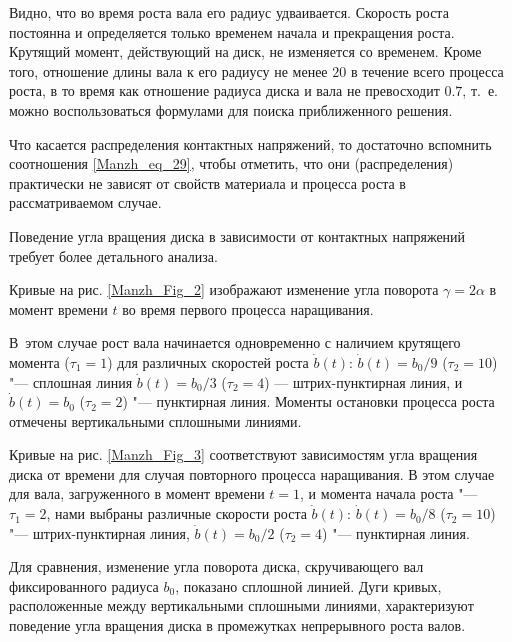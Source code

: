 Видно, что во время роста вала его радиус удваивается. Скорость роста постоянна и определяется только временем начала и прекращения роста. Крутящий момент, действующий на диск, не изменяется со временем. Кроме того, отношение длины вала к его радиусу не менее $20 $ в течение всего процесса роста, в то время как отношение радиуса диска и вала не превосходит $0.7 $, т.~е. можно воспользоваться формулами для поиска приближенного решения.





Что касается распределения контактных напряжений, то достаточно вспомнить соотношения \eqref{Manzh_eq_29}, чтобы отметить, что они (распределения) практически не зависят от свойств материала и процесса роста в рассматриваемом случае.



Поведение угла вращения диска в зависимости от контактных напряжений требует более детального анализа.



Кривые на рис. \ref{Manzh_Fig_2} изображают изменение угла поворота $\gamma=2\alpha$ в момент времени $t$ во время первого процесса наращивания. 

В~этом случае рост вала начинается одновременно с наличием крутящего момента ($\tau_1=1$) для различных скоростей роста $\dot b(t)$: $\dot b(t)=b_0/9$ ($\tau_2=10$) "--- сплошная линия $\dot b(t)=b_0/3$ ($\tau_2=4$) --- штрих-пунктирная линия, и $\dot b(t)=b_0$ ($\tau_2=2$) "--- пунктирная линия. Моменты остановки процесса роста отмечены вертикальными сплошными линиями.





Кривые на рис. \ref{Manzh_Fig_3} соответствуют зависимостям угла вращения диска от времени для случая повторного процесса наращивания. В этом случае для вала, загруженного в момент времени $t=1$, и момента начала роста "--- $\tau_1=2$, нами выбраны различные скорости роста $\dot b(t)$: $\dot b(t)=b_0/8$ ($\tau_2=10$) "--- штрих-пунктирная линия, $\dot b(t)=b_0/2$ ($\tau_2=4$) "--- пунктирная линия. 

Для сравнения, изменение угла поворота диска, скручивающего вал фиксированного радиуса $b_0$, показано сплошной линией. Дуги кривых, расположенные между вертикальными сплошными линиями, характеризуют поведение угла вращения диска в промежутках непрерывного роста валов.









